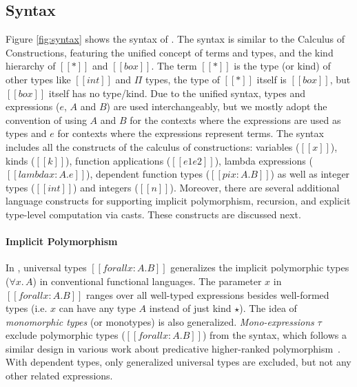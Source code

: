 \subsection{Syntax}

Figure \ref{fig:syntax} shows the syntax of \name. The syntax is similar
to the Calculus of Constructions, featuring the unified concept of terms and types,
and the kind hierarchy of $[[*]]$ and $[[box]]$.
The term $[[*]]$ is the type (or kind) of other types like $[[int]]$ and $\Pi$ types,
the type of $[[*]]$ itself is $[[box]]$, but $[[box]]$ itself has no type/kind.
Due to the unified syntax, types and
expressions ($e$, $A$ and $B$) are used
interchangeably, but we mostly adopt the convention of using $A$ and $B$
for the contexts where the expressions are used as types and $e$ for contexts
where the expressions represent terms.
The syntax includes all the constructs of the calculus of constructions:
variables ($[[x]]$), kinds ($[[k]]$), function applications  ($[[e1 e2]]$),
lambda expressions ($[[lambda x : A. e]]$), dependent function types ($[[pi x : A. B]]$)
as well as integer types ($[[int]]$) and integers ($[[n]]$).
Moreover, there are several additional language constructs for
supporting implicit polymorphism, recursion, and explicit type-level computation
via casts. These constructs are discussed next.

\paragraph{Implicit Polymorphism}
In \name, universal types $[[forall x : A. B]]$ generalizes the implicit
polymorphic types ($\forall x.\, A$) in conventional functional languages.
The parameter $x$ in $[[forall x : A. B]]$ ranges over all well-typed expressions besides well-formed
types (i.e. $x$ can have any type $A$ instead of just kind $\star$). The idea of
\emph{monomorphic types} (or monotypes) is also generalized.
\emph{Mono-expressions} $\tau$ exclude polymorphic types ($[[forall x : A. B]]$) from the syntax,
which follows a similar design in various work about predicative
higher-ranked polymorphism~\citep{odersky1996putting,dunfield2013complete,jones2007practical}.
With dependent types, only generalized universal types are excluded, but not
any other related expressions.

